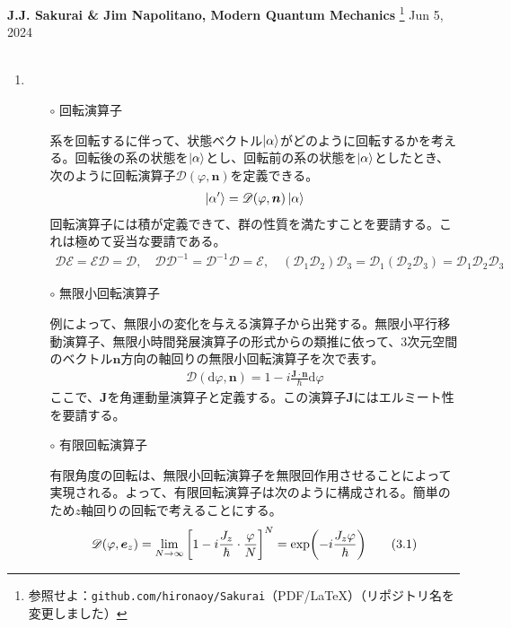\documentclass{jarticle}
\begin{document}
\noindent
\textbf{J.J. Sakurai \& Jim Napolitano, Modern Quantum Mechanics}
\footnote{
参照せよ：\texttt{github.com/hironaoy/Sakurai}（PDF/\LaTeX）（リポジトリ名を変更しました）
}
\hfill Jun 5, 2024\vspace{-2mm} \\
\hrulefill \\

\noindent
\begin{enumerate}

\item {}

  \begin{itemize}
    \item [$\circ$] 回転演算子

    系を回転するに伴って、状態ベクトル$\ket{\alpha}$がどのように回転するかを考える。回転後の系の状態を$\ket{\alpha}$とし、回転前の系の状態を$\ket{\alpha}$としたとき、次のように回転演算子$\mathscr{D}(\varphi, \bm{n})$を定義できる。
    \begin{align}
      \ket{\alpha'} = \mathscr{D}(\varphi, \bm{n}) \ket{\alpha}
    \end{align}
    回転演算子には積が定義できて、群の性質を満たすことを要請する。これは極めて妥当な要請である。
    \begin{align}
      \mathscr{D}\mathscr{E} = \mathscr{E}\mathscr{D} = \mathscr{D}, \quad \mathscr{D}\mathscr{D}^{-1} =  \mathscr{D}^{-1}\mathscr{D} = \mathscr{E}, \quad (\mathscr{D}_1\mathscr{D}_2)\mathscr{D}_3 = \mathscr{D}_1(\mathscr{D}_2\mathscr{D}_3) =  \mathscr{D}_1\mathscr{D}_2\mathscr{D}_3
    \end{align}

  \item [$\circ$] 無限小回転演算子
    
    例によって、無限小の変化を与える演算子から出発する。無限小平行移動演算子、無限小時間発展演算子の形式からの類推に依って、3次元空間のベクトル$\bm{n}$方向の軸回りの無限小回転演算子を次で表す。
    \begin{align}
      \mathscr{D}(\mathrm{d}\varphi, \bm{n}) = 1 - i\frac{\bm{J}\cdot\bm{n}}{\hbar}\mathrm{d}\varphi
    \end{align}
    ここで、$\bm{J}$を角運動量演算子と定義する。この演算子$\bm{J}$にはエルミート性を要請する。

  \item [$\circ$] 有限回転演算子

    有限角度の回転は、無限小回転演算子を無限回作用させることによって実現される。よって、有限回転演算子は次のように構成される。簡単のため$z$軸回りの回転で考えることにする。
    \begin{align}
      \mathscr{D}(\varphi, \bm{e}_z) = \lim_{N \rightarrow \infty} \qty[1 - i\frac{J_z}{\hbar} \cdot \frac{\varphi}{N}]^N = \exp(-i\frac{J_z\varphi}{\hbar}) \tag{3.1} \label{AMZ}
    \end{align}


\end{itemize}
\end{enumerate}
\end{document}

